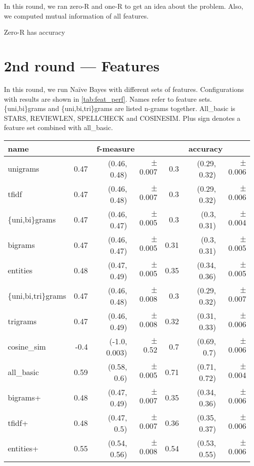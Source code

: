 In this round, we ran zero-R and one-R to get an idea about the problem.
Also, we computed mutual information of all features.

Zero-R has accuracy


\section{2nd round --- Features}

In this round, we run Na\"{i}ve Bayes with different sets of features.
Configurations with results are shown in \autoref{tab:feat_perf}.
Names refer to feature sets.
\{uni,bi\}grams and \{uni,bi,tri\}grams are listed n-grams together.
All\_basic is STARS, REVIEWLEN, SPELLCHECK and COSINESIM.
Plus sign denotes a feature set combined with all\_basic.

\begin{table}[h!]

\centering
\begin{tabular}{lr@{~}r@{~}rr@{~}r@{~}r}
\toprule
\textbf{name}	& \multicolumn{3}{c}{\textbf{f-measure}} & \multicolumn{3}{c}{\textbf{accuracy}} \\
\midrule
unigrams& 0.47 & (0.46, 0.48) & $\pm$ 0.007 & 0.3 & (0.29, 0.32) & $\pm$ 0.006 \\
tfidf& 0.47 & (0.46, 0.48) & $\pm$ 0.007 & 0.3 & (0.29, 0.32) & $\pm$ 0.006 \\
\{uni,bi\}grams	& 0.47 & (0.46, 0.47) & $\pm$ 0.005 & 0.3 & (0.3, 0.31) & $\pm$ 0.004\\
bigrams & 0.47 & (0.46, 0.47) & $\pm$ 0.005 & 0.31 & (0.3, 0.31) & $\pm$ 0.005			\\
entities & 0.48 & (0.47, 0.49) & $\pm$ 0.005 & 0.35 & (0.34, 0.36) & $\pm$ 0.005		\\
\{uni,bi,tri\}grams & 0.47 & (0.46, 0.48) & $\pm$ 0.008 & 0.3 & (0.29, 0.32) & $\pm$ 0.007	\\
trigrams & 0.47 & (0.46, 0.49) & $\pm$ 0.008 & 0.32 & (0.31, 0.33) & $\pm$ 0.006		\\
cosine\_sim & -0.4 & (-1.0, 0.003) & $\pm$ 0.52 & 0.7 & (0.69, 0.7) & $\pm$ 0.006		\\
all\_basic & 0.59 & (0.58, 0.6) & $\pm$ 0.005 & 0.71 & (0.71, 0.72) & $\pm$ 0.004		\\
bigrams+ & 0.48 & (0.47, 0.49) & $\pm$ 0.007 & 0.35 & (0.34, 0.36) & $\pm$ 0.006		\\
tfidf+ & 0.48 & (0.47, 0.5) & $\pm$ 0.007 & 0.36 & (0.35, 0.37) & $\pm$ 0.006			\\
entities+ & 0.55 & (0.54, 0.56) & $\pm$ 0.008 & 0.54 & (0.53, 0.55) & $\pm$ 0.006		\\


\end{tabular}
\end{table}
